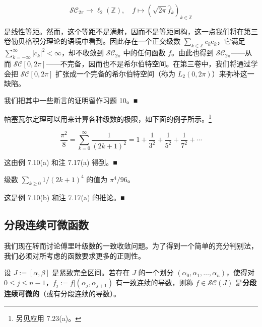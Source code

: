 \begin{remark}
\begin{items}
\[
\mathcal{SC}_{2\pi} \to \ell_{2}(\mathbb{Z}) , \quad f \mapsto (\sqrt{2\pi}\hat{f}_{k})_{k \in \mathbb{Z}}
\]

是线性等距。然而，这个等距不是满射，因而不是等距同构，这一点我们将在第三卷勒贝格积分理论的语境中看到。因此存在一个正交级数 $ \sum_{k \in \mathbb{Z}} c_{k}\mathrm{e}_{k} $，它满足 $ \sum_{k=-\infty}^{\infty}|c_{k}|^{2} < \infty $，却不收敛到 $ \mathcal{SC}_{2\pi} $ 中的任何函数 $ f $。由此也得到 $ \mathcal{SC}_{2\pi} $——从而 $ \mathcal{SC}[0, 2\pi] $——不完备，因而也不是希尔伯特空间。在第三卷中，我们将通过学会把 $ \mathcal{SC}[0, 2\pi] $ 扩张成一个完备的希尔伯特空间（称为 $ L_{2}(0, 2\pi) $）来弥补这一缺陷。

\proofhead
我们把其中一些断言的证明留作习题 10。\nobreak\hspace{0.35em}■
\end{items}

帕塞瓦尔定理可以用来计算各种级数的极限，如下面的例子所示。\footnote{另见应用 7.23(a)。}

\end{remark}

\begin{example}

\begin{items}
\item
\[
\frac{\pi^{2}}{8} = \sum_{k=0}^{\infty}\frac{1}{(2k+1)^{2}} = 1 + \frac{1}{3^{2}} + \frac{1}{5^{2}} + \frac{1}{7^{2}} + \cdots
\]

\proofhead
这由例 7.10(a) 和注 7.17(a) 得到。\nobreak\hspace{0.35em}■
\item

级数 $ \sum_{k \ge 0} 1/(2k+1)^{4} $ 的值为 $ \pi^{4}/96 $。

\proofhead
这是例 7.10(b) 和注 7.17(a) 的推论。\nobreak\hspace{0.35em}■
\end{items}

\end{example}

\subsection*{分段连续可微函数}

我们现在转而讨论傅里叶级数的一致收敛问题。为了得到一个简单的充分判别法，我们必须对所考虑的函数要求更多的正则性。

设 $ J := [\alpha, \beta] $ 是紧致完全区间。若存在 $ J $ 的一个划分 $ (\alpha_{0}, \alpha_{1}, \ldots, \alpha_{n}) $，使得对 $ 0 \le j \le n-1 $，$ f_{j} := f|(\alpha_{j}, \alpha_{j+1}) $ 有一致连续的导数，则称 $ f \in \mathcal{SC}(J) $ 是\textbf{分段连续可微的}（或有分段连续的导数）。

